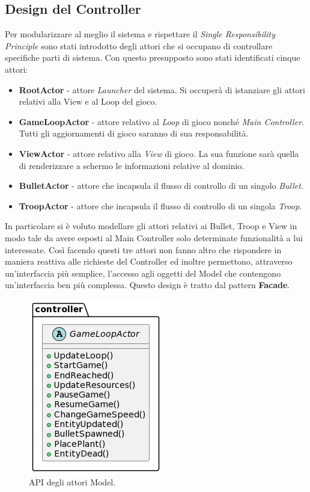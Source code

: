 \subsection{Design del Controller}
Per modularizzare al meglio il sistema e rispettare il \textit{Single Responsibility Principle}
sono stati introdotto degli attori che si occupano di controllare specifiche parti di sistema. Con questo presupposto sono
stati identificati cinque attori:
\begin{itemize}
    \item \textbf{RootActor} - attore \textit{Launcher} del sistema. Si occuperà di
    istanziare gli attori relativi alla View e al Loop del gioco.
    \item \textbf{GameLoopActor} - attore relativo al \textit{Loop} di gioco nonché
    \textit{Main Controller}. Tutti gli aggiornamenti di gioco saranno di sua responsabilità.
    \item \textbf{ViewActor} - attore relativo alla \textit{View} di gioco.
    La sua funzione sarà quella di renderizzare a schermo le informazioni relative al dominio.
    \item \textbf{BulletActor} - attore che incapsula il flusso di controllo di un singolo \textit{Bullet}.
    \item \textbf{TroopActor} - attore che incapsula il flusso di controllo di un singola \textit{Troop}.
\end{itemize}
In particolare si è voluto modellare gli attori relativi ai Bullet, Troop e
View in modo tale da avere esposti al Main
Controller solo determinate funzionalità a lui interessate.
Così facendo questi tre attori non fanno altro che rispondere
in maniera reattiva alle richieste del Controller ed inoltre permettono,
attraverso un'interfaccia più semplice, l'accesso
agli oggetti del Model che contengono un'interfaccia ben più complessa.
Questo design è tratto dal pattern \textbf{Facade}.

\begin{figure}[H]
    \centering
    \includegraphics[width=0.61\linewidth]{images/detail-controller.png}
    \caption{API degli attori Model.}
\end{figure}



